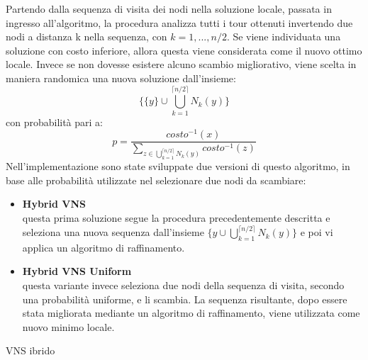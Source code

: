 Partendo dalla sequenza di visita dei nodi nella soluzione locale, passata in ingresso all'algoritmo, la procedura analizza tutti i tour ottenuti invertendo due nodi a distanza k nella sequenza, con $k=1,...,n/2$. Se viene individuata una soluzione con costo inferiore, allora questa viene considerata come il nuovo ottimo locale. Invece se non dovesse esistere alcuno scambio migliorativo, viene scelta in maniera randomica una nuova soluzione dall'insieme:
$$\biggl\{\{y\}\cup \bigcup_{k=1}^{\lceil n/2 \rceil}{N_k(y)}\biggr\}$$
con probabilità pari a:
$$p=\frac{costo^{-1}(x)}{\underset{z \in {\bigcup_{k=1}^{\lceil n/2 \rceil}{N_k(y)}}}\sum{costo^{-1}(z)}}$$
Nell'implementazione sono state sviluppate due versioni di questo algoritmo, in base alle probabilità utilizzate nel selezionare due nodi da scambiare: 
\begin{itemize}
\item{\textbf{Hybrid VNS}\\
questa prima soluzione segue la procedura precedentemente descritta e seleziona una nuova sequenza dall'insieme $\{{y}\cup \bigcup_{k=1}^{\lceil n/2 \rceil}{N_k(y)}\}$ e poi vi applica un algoritmo di raffinamento.} 
\item{\textbf{Hybrid VNS Uniform}\\
questa variante invece seleziona due nodi della sequenza di visita, secondo una probabilità uniforme, e li scambia. La sequenza risultante, dopo essere stata migliorata mediante un algoritmo di raffinamento, viene utilizzata come nuovo minimo locale.}
\end{itemize}
\begin{algorithm}[h]
\DontPrintSemicolon
{}
\BlankLine
{}
 \caption{VNS ibrido}\label{VNS}
\end{algorithm}
